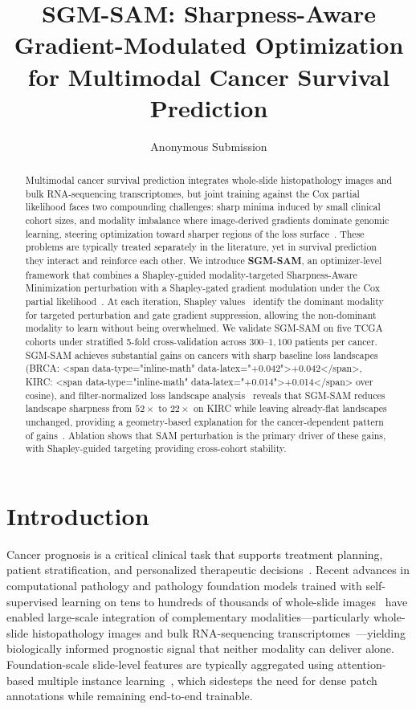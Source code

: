 \documentclass[10pt]{article}\usepackage[utf8]{inputenc}\usepackage[T1]{fontenc}\usepackage{amsmath,amssymb,amsfonts,bm}\usepackage{booktabs}\usepackage{multirow}\usepackage{array}\usepackage{graphicx}\usepackage{algorithm}\usepackage{algorithmic}\usepackage{xcolor}\usepackage[margin=1in]{geometry}\usepackage{microtype}
\title{\textbf{SGM-SAM: Sharpness-Aware Gradient-Modulated Optimization \\ for Multimodal Cancer Survival Prediction}}\author{Anonymous Submission}\date{}
\begin{document}
\maketitle
\begin{abstract}
Multimodal cancer survival prediction integrates whole-slide histopathology images and bulk RNA-sequencing transcriptomes, but joint training against the Cox partial likelihood faces two compounding challenges: sharp minima induced by small clinical cohort sizes, and modality imbalance where image-derived gradients dominate genomic learning, steering optimization toward sharper regions of the loss surface~\cite{wang2020hard,peng2022balanced}. These problems are typically treated separately in the literature, yet in survival prediction they interact and reinforce each other. We introduce \textbf{SGM-SAM}, an optimizer-level framework that combines a Shapley-guided modality-targeted Sharpness-Aware Minimization perturbation with a Shapley-gated gradient modulation under the Cox partial likelihood~\cite{cox1972}. At each iteration, Shapley values~\cite{shapley1953} identify the dominant modality for targeted perturbation and gate gradient suppression, allowing the non-dominant modality to learn without being overwhelmed. We validate SGM-SAM on five TCGA cohorts under stratified 5-fold cross-validation across $300$--$1{,}100$ patients per cancer. SGM-SAM achieves substantial gains on cancers with sharp baseline loss landscapes (BRCA: <span data-type="inline-math" data-latex="+0.042">+0.042</span>, KIRC: <span data-type="inline-math" data-latex="+0.014">+0.014</span> over cosine), and filter-normalized loss landscape analysis~\cite{li2018visualizing} reveals that SGM-SAM reduces landscape sharpness from $52\times$ to $22\times$ on KIRC while leaving already-flat landscapes unchanged, providing a geometry-based explanation for the cancer-dependent pattern of gains~\cite{keskar2017largebatch,hochreiter1997flat,jiang2020fantastic,andriushchenko2023modern}. Ablation shows that SAM perturbation is the primary driver of these gains, with Shapley-guided targeting providing cross-cohort stability.
\end{abstract}

\section{Introduction}\label{sec:intro}
Cancer prognosis is a critical clinical task that supports treatment planning, patient stratification, and personalized therapeutic decisions~\cite{bray2024global}. Recent advances in computational pathology and pathology foundation models trained with self-supervised learning on tens to hundreds of thousands of whole-slide images~\cite{chen2024path,vorontsov2024uni,lu2024path} have enabled large-scale integration of complementary modalities---particularly whole-slide histopathology images and bulk RNA-sequencing transcriptomes~\cite{chen2021mcat,chen2022porpoise,acosta2022multimodal}---yielding biologically informed prognostic signal that neither modality can deliver alone. Foundation-scale slide-level features are typically aggregated using attention-based multiple instance learning~\cite{lu2021clam}, which sidesteps the need for dense patch annotations while remaining end-to-end trainable.
\end{document}
